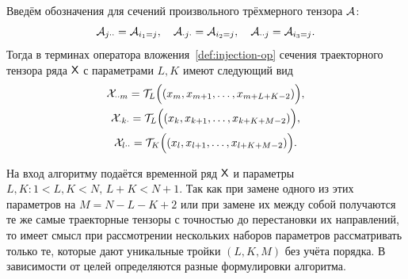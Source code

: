 \documentclass[specialist,
  substylefile=spbu_report.rtx,
subf,href,colorlinks=true, 12pt]{disser}
\theoremstyle{plain}
\theoremstyle{definition}
\theoremstyle{remark}
\begin{document}
Введём обозначения для сечений произвольного трёхмерного тензора $\mathcal{A}$:
\[
  \mathcal{A}_{j \cdot \cdot} = \mathcal{A}_{i_1=j}, \quad
  \mathcal{A}_{\cdot j \cdot} = \mathcal{A}_{i_2=j}, \quad
  \mathcal{A}_{\cdot \cdot j} = \mathcal{A}_{i_3=j}.
\]
Тогда в терминах оператора вложения~\ref{def:injection-op} сечения
траекторного тензора ряда $\mathsf{X}$
с параметрами $L, K$ имеют следующий вид
\begin{gather*}
  \mathcal{X}_{\cdot \cdot m}= \mathcal{T}_L \Big((x_m, x_{m+1}, \ldots,
  x_{m+L+K-2})\Big),\\
  \mathcal{X}_{\cdot k \cdot}= \mathcal{T}_L \Big((x_k, x_{k+1}, \ldots,
  x_{k+K+M-2})\Big),\\
  \mathcal{X}_{l\cdot \cdot}=\mathcal{T}_K \Big((x_l, x_{l+1}, \ldots,
  x_{l+K+M-2})\Big).
\end{gather*}

На вход алгоритму подаётся временной ряд $\mathsf{X}$ и параметры $L,K: 1<
L,K < N,\, L + K < N + 1$.
Так как при замене одного из этих параметров на $M=N-L-K+2$ или при
замене их между собой получаются
те же самые траекторные тензоры с точностью до перестановки их
направлений, то имеет смысл при
рассмотрении нескольких наборов параметров рассматривать только те,
которые дают уникальные тройки $(L, K, M)$
без учёта порядка.
В зависимости от целей определяются разные формулировки алгоритма.
\end{document}

